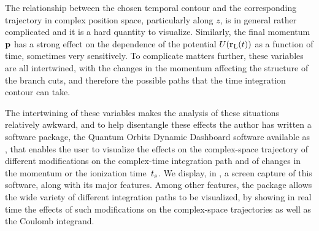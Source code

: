 The relationship between the chosen temporal contour and the corresponding trajectory in complex position space, particularly along $z$, is in general rather complicated and it is a hard quantity to visualize. Similarly, the final momentum $\vb{p}$ has a strong effect on the dependence of the potential $U(\vb{r}_\mathrm{L}(t))$ as a function of time, sometimes very sensitively. To complicate matters further, these variables are all intertwined, with the changes in the momentum affecting the structure of the branch cuts, and therefore the possible paths that the time integration contour can take.



The intertwining of these variables makes the analysis of these situations relatively awkward, and to help disentangle these effects the author has written a software package, the Quantum Orbits Dynamic Dashboard software available as , that enables the user to visualize the effects on the complex-space trajectory of different modifications on the complex-time integration path and of changes in the momentum or the ionization time~${t_s}$. We display, in , a screen capture of this software, along with its major features. Among other features, the package allows the wide variety of different integration paths to be visualized, by showing in real time the effects of such modifications on the complex-space trajectories as well as the Coulomb integrand.




